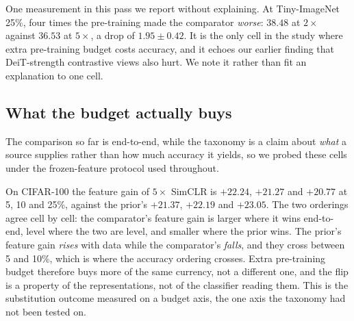 One measurement in this pass we report without explaining. At
Tiny-ImageNet 25\%, four times the pre-training made the comparator
\emph{worse}: $38.48$ at $2\times$ against $36.53$ at $5\times$, a drop of
$1.95 \pm 0.42$. It is the only cell in the study where extra pre-training
budget costs accuracy, and it echoes our earlier finding that
DeiT-strength contrastive views also hurt. We note it rather than fit an
explanation to one cell.

\subsection{What the budget actually buys}\label{sec:budget:features}
The comparison so far is end-to-end, while the taxonomy is a claim about
\emph{what} a source supplies rather than how much accuracy it yields, so we
probed these cells under the frozen-feature protocol used throughout.

On CIFAR-100 the feature gain of $5\times$ SimCLR is $+22.24$, $+21.27$ and
$+20.77$ at 5, 10 and 25\%, against the prior's $+21.37$, $+22.19$ and
$+23.05$. The two orderings agree cell by cell: the comparator's feature
gain is larger where it wins end-to-end, level where the two are level, and
smaller where the prior wins. The prior's feature gain \emph{rises} with
data while the comparator's \emph{falls}, and they cross between 5 and
10\%, which is where the accuracy ordering crosses. Extra pre-training
budget therefore buys more of the same currency, not a different one,
and the flip is a property of the representations, not of the classifier reading them. This is the substitution outcome measured on a
budget axis, the one axis the taxonomy had not been tested on.

